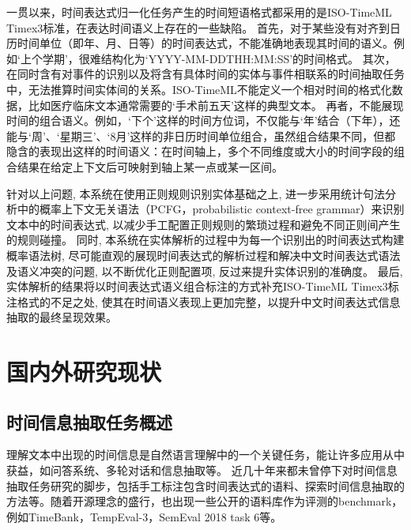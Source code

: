 一贯以来，时间表达式归一化任务产生的时间短语格式都采用的是ISO-TimeML Timex3标准，在表达时间语义上存在的一些缺陷。
首先，对于某些没有对齐到日历时间单位（即年、月、日等）的时间表达式，不能准确地表现其时间的语义。例如‘上个学期’，很难结构化为‘YYYY-MM-DDTHH:MM:SS’的时间格式。
其次，在同时含有对事件的识别以及将含有具体时间的实体与事件相联系的时间抽取任务中，无法推算时间实体间的关系。ISO-TimeML不能定义一个相对时间的格式化数据，比如医疗临床文本通常需要的‘手术前五天’这样的典型文本。
再者，不能展现时间的组合语义。例如，‘下个’这样的时间方位词，不仅能与‘年’结合（下年），还能与‘周’、‘星期三’、‘8月’这样的非日历时间单位组合，虽然组合结果不同，但都隐含的表现出这样的时间语义：在时间轴上，多个不同维度或大小的时间字段的组合结果在给定上下文后可映射到轴上某一点或某一区间。

针对以上问题, 本系统在使用正则规则识别实体基础之上, 进一步采用统计句法分析中的概率上下文无关语法（PCFG，probabilistic context-free grammar）来识别文本中的时间表达式, 
以减少手工配置正则规则的繁琐过程和避免不同正则间产生的规则碰撞。
同时, 本系统在实体解析的过程中为每一个识别出的时间表达式构建概率语法树, 尽可能直观的展现时间表达式的解析过程和解决中文时间表达式语法及语义冲突的问题, 以不断优化正则配置项, 反过来提升实体识别的准确度。
最后, 实体解析的结果将以时间表达式语义组合标注的方式补充ISO-TimeML Timex3标注格式的不足之处, 使其在时间语义表现上更加完整，以提升中文时间表达式信息抽取的最终呈现效果。



\section{国内外研究现状}

\subsection{时间信息抽取任务概述}

理解文本中出现的时间信息是自然语言理解中的一个关键任务，能让许多应用从中获益，如问答系统、多轮对话和信息抽取等。
近几十年来都未曾停下对时间信息抽取任务研究的脚步，包括手工标注包含时间表达式的语料、探索时间信息抽取的方法等。随着开源理念的盛行，也出现一些公开的语料库作为评测的benchmark，
例如TimeBank\cite{Pustejovsky03}，TempEval-3\cite{uzzaman-etal-2013-semeval}，SemEval 2018 task 6\cite{laparra-etal-2018-semeval}等。

